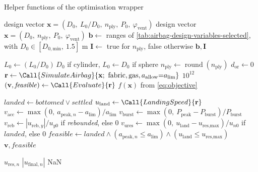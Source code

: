 \begin{algobox}[label=alg:de_helpers]{Helper functions of the optimisation wrapper}
\begin{algorithmic}[1]
 
    \State design vector $\mathbf{x} = (D_0,\ L_0/D_0,\ n_\text{ply},\ P_0,\ \varphi_\text{vent})$
  \Else
    \State design vector $\mathbf{x} = (D_0,\ n_\text{ply},\ P_0,\ \varphi_\text{vent})$ 
  \EndIf
  \State $\mathbf{b} \gets$ ranges of \cref{tab:airbag-design-variables-selected}, with $D_0 \in [D_{0,\text{min}},\ 1.5]$ m
  \State $\mathbf{I} \gets$ true for $n_\text{ply}$, false otherwise 
  \State \Return $\mathbf{b}, \mathbf{I}$
\EndFunction

\Statex
{}
  \State $L_0 \gets (L_0/D_0)\,D_0$ if cylinder, $L_0 \gets D_0$ if sphere 
  \State $n_\text{ply} \gets \operatorname{round}(n_\text{ply})$
  \State $d_\text{or} \gets 0$ 
  \State $\mathbf{r} \gets \Call{SimulateAirbag}{\mathbf{x};\ \text{fabric}, \text{gas}, a_\text{allow}{=}a_\text{lim}}$ 
    \State \Return $10^{12}$
  \EndIf
  \State $(\mathbf{v}, \mathit{feasible}) \gets \Call{Evaluate}{\mathbf{r}}$
  \State \Return $f(\mathbf{x})$ from \cref{eq:objective} 
\EndFunction

\Statex
{} 
  \State $\mathit{landed} \gets \textit{bottomed} \lor \textit{settled}$ 
  \State $u_\text{land} \gets \Call{LandingSpeed}{\mathbf{r}}$
  \State $v_\text{acc} \gets \max(0,\ a_{\text{peak},n} - a_\text{lim})/a_\text{lim}$
  \State $v_\text{burst} \gets \max(0,\ P_\text{peak} - P_\text{burst})/P_\text{burst}$
  \State $v_\text{reb} \gets |u_{\text{reb},y}|/u_{y0}$ if \textit{rebounded}, else $0$
  \State $v_\text{ures} \gets \max(0,\ u_\text{land} - u_\text{res,max})/u_{n0}$ if $\mathit{landed}$, else $0$
  \State $\mathit{feasible} \gets \mathit{landed} \land (a_{\text{peak},n} \le a_\text{lim}) \land (u_\text{land} \le u_\text{res,max})$
  \State \Return $\mathbf{v}, \mathit{feasible}$
\EndFunction

\Statex
{} 
    \State \Return $u_{\text{res},n}$ 
    \State \Return $|u_{\text{final},n}|$ 
  \Else
    \State \Return NaN 
  \EndIf
\EndFunction
\end{algorithmic}
\end{algobox}
